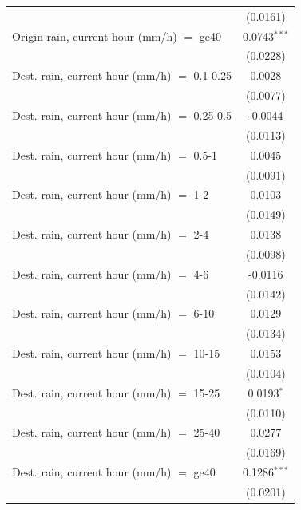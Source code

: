 \begin{tabular}{lc}
                                                 & (0.0161)\\   
   Origin rain, current hour (mm/h) $=$ ge40     & 0.0743$^{***}$\\   
                                                 & (0.0228)\\   
   Dest. rain, current hour (mm/h) $=$ 0.1-0.25  & 0.0028\\   
                                                 & (0.0077)\\   
   Dest. rain, current hour (mm/h) $=$ 0.25-0.5  & -0.0044\\   
                                                 & (0.0113)\\   
   Dest. rain, current hour (mm/h) $=$ 0.5-1     & 0.0045\\   
                                                 & (0.0091)\\   
   Dest. rain, current hour (mm/h) $=$ 1-2       & 0.0103\\   
                                                 & (0.0149)\\   
   Dest. rain, current hour (mm/h) $=$ 2-4       & 0.0138\\   
                                                 & (0.0098)\\   
   Dest. rain, current hour (mm/h) $=$ 4-6       & -0.0116\\   
                                                 & (0.0142)\\   
   Dest. rain, current hour (mm/h) $=$ 6-10      & 0.0129\\   
                                                 & (0.0134)\\   
   Dest. rain, current hour (mm/h) $=$ 10-15     & 0.0153\\   
                                                 & (0.0104)\\   
   Dest. rain, current hour (mm/h) $=$ 15-25     & 0.0193$^{*}$\\   
                                                 & (0.0110)\\   
   Dest. rain, current hour (mm/h) $=$ 25-40     & 0.0277\\   
                                                 & (0.0169)\\   
   Dest. rain, current hour (mm/h) $=$ ge40      & 0.1286$^{***}$\\   
                                                 & (0.0201)\\   

\end{tabular}

